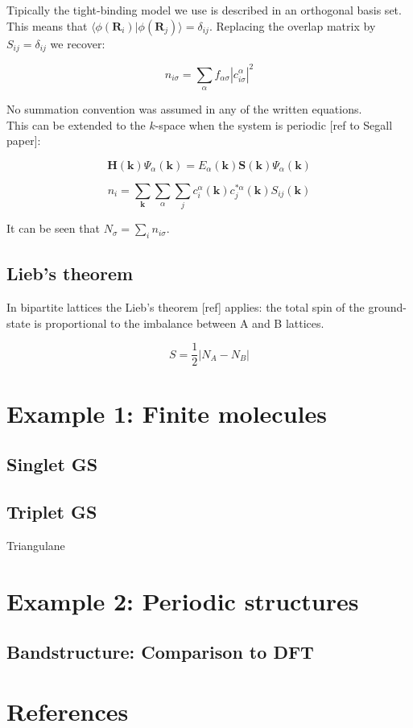 \documentclass[amsmath,%
amssymb,prb,superscriptaddress]{revtex4}
\begin{document}
\medskip

Tipically the tight-binding model we use is described in an orthogonal basis set. This means that $\langle \phi (\mathbf{R}_{i}) | \phi (\mathbf{R}_{j}) \rangle = \delta_{ij}$. Replacing the overlap matrix by $S_{ij}=\delta_{ij}$  we recover:

\begin{equation}
n_{i\sigma} = \sum_{\alpha}f_{\alpha\sigma}\left| c^{\alpha}_{i\sigma}\right|^{2}
\end{equation}


No summation convention was assumed in any of the written equations.\\

This can be extended to the $k$-space when the system is periodic [ref to Segall paper]:


\begin{equation}
\textbf{H}(\textbf{k})\Psi_{\alpha}(\textbf{k}) = E_{\alpha}(\textbf{k})\textbf{S}(\textbf{k})\Psi_{\alpha}(\textbf{k})
\end{equation}

\begin{equation}
n_{i} = \sum_{\textbf{k}}\sum_{\alpha}\sum_{j}c^{\alpha}_{i}(\textbf{k})c^{*\alpha}_{j}(\textbf{k})S_{ij}(\textbf{k})
\end{equation}


It can be seen that $N_{\sigma}=\sum_{i}n_{i\sigma}$.


\subsection{Lieb's theorem}

In bipartite lattices the Lieb's theorem [ref] applies: the total spin of the ground-state is proportional to the imbalance between A and B lattices.

\begin{equation}\label{eq:Lieb_theorem}
S = \frac{1}{2}\left|N_{A}-N_{B}\right|
\end{equation}


\section{Example 1: Finite molecules}

\subsection{Singlet GS}



\subsection{Triplet GS}
Triangulane


\section{Example 2: Periodic structures}

\subsection{Bandstructure: Comparison to DFT}


\section{References}
\end{document}
